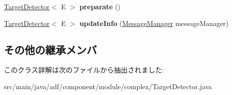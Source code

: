\begin{DoxyCompactItemize}
\hypertarget{classadf_1_1component_1_1module_1_1complex_1_1TargetDetector_a35d229e5ec0ef648aa8efd895abf5ebc}{}\label{classadf_1_1component_1_1module_1_1complex_1_1TargetDetector_a35d229e5ec0ef648aa8efd895abf5ebc} 
\hyperlink{classadf_1_1component_1_1module_1_1complex_1_1TargetDetector}{Target\+Detector}$<$ E $>$ {\bfseries preparate} ()
\item 
\hypertarget{classadf_1_1component_1_1module_1_1complex_1_1TargetDetector_a4c22a759fe59b2b6ee23006abbfb1210}{}\label{classadf_1_1component_1_1module_1_1complex_1_1TargetDetector_a4c22a759fe59b2b6ee23006abbfb1210} 
\hyperlink{classadf_1_1component_1_1module_1_1complex_1_1TargetDetector}{Target\+Detector}$<$ E $>$ {\bfseries update\+Info} (\hyperlink{classadf_1_1agent_1_1communication_1_1MessageManager}{Message\+Manager} message\+Manager)
\end{DoxyCompactItemize}
\subsection*{その他の継承メンバ}


このクラス詳解は次のファイルから抽出されました\+:\begin{DoxyCompactItemize}
\item 
src/main/java/adf/component/module/complex/Target\+Detector.\+java\end{DoxyCompactItemize}
